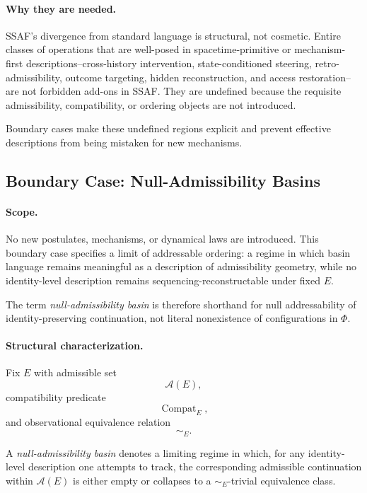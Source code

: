 \documentclass[aps,prx,onecolumn,11pt]{revtex4-2}
\theoremstyle{plain}
\theoremstyle{definition}
\theoremstyle{remark}
\newcommand{\Compat}{\operatorname{Compat}} %
\begin{document}
\paragraph{Why they are needed.}

SSAF's divergence from standard language is structural, not cosmetic.
Entire classes of operations that are well-posed in spacetime-primitive
or mechanism-first descriptions--cross-history intervention,
state-conditioned steering, retro-admissibility, outcome targeting,
hidden reconstruction, and access restoration--are not forbidden
add-ons in SSAF. They are undefined because the requisite admissibility,
compatibility, or ordering objects are not introduced.

Boundary cases make these undefined regions explicit and prevent
effective descriptions from being mistaken for new mechanisms.

\subsection{Boundary Case: Null-Admissibility Basins}
\label{appG:null_admissibility_basins}

\paragraph{Scope.}

No new postulates, mechanisms, or dynamical laws are introduced. This
boundary case specifies a limit of addressable ordering: a regime in
which basin language remains meaningful as a description of
admissibility geometry, while no identity-level description remains
sequencing-reconstructable under fixed \(E\).

The term \emph{null-admissibility basin} is therefore shorthand for
null addressability of identity-preserving continuation, not literal
nonexistence of configurations in \(\Phi\).

\paragraph{Structural characterization.}

Fix \(E\) with admissible set
\[
\mathcal A(E),
\]
compatibility predicate
\[
\Compat_E,
\]
and observational equivalence relation
\[
\sim_E.
\]

A \emph{null-admissibility basin} denotes a limiting regime in which,
for any identity-level description one attempts to track, the
corresponding admissible continuation within \(\mathcal A(E)\) is either
empty or collapses to a \(\sim_E\)-trivial equivalence class.
\end{document}
